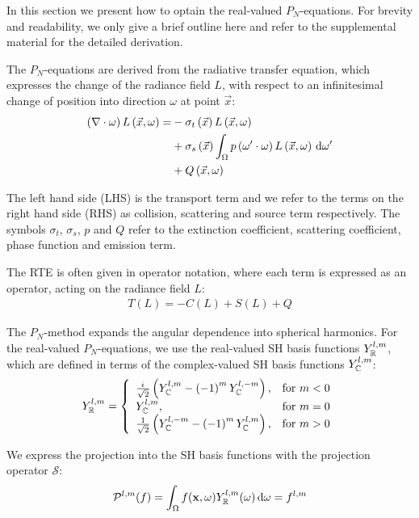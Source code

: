 In this section we present how to optain the real-valued $P_N$-equations. For brevity and readability, we only give a brief outline here and refer to the supplemental material for the detailed derivation.

The $P_N$-equations are derived from the radiative transfer equation, which expresses the change of the radiance field $L$, with respect to an infinitesimal change of position into direction $\omega$ at point $\vec{x}$:
\begin{align}
\left(\nabla\cdot\omega\right)L\left(\vec{x}, \omega \right)
=&
-\sigma_t\left(\vec{x}\right) L\left(\vec{x}, \omega \right)\nonumber\\
&
+\sigma_s\left(\vec{x}\right) \int_{\Omega}
{
p\left(\omega'\cdot\omega\right)L\left(\vec{x}, \omega \right)\,\mathrm{d}\omega'
}\nonumber\\
&
+Q\left(\vec{x}, \omega\right)\nonumber
\end{align}

The left hand side (LHS) is the transport term and we refer to the terms on the right hand side (RHS) as collision, scattering and source term respectively. The symbols $\sigma_t$, $\sigma_s$, $p$ and $Q$ refer to the extinction coefficient, scattering coefficient, phase function and emission term.

The RTE is often given in operator notation, where each term is expressed as an operator, acting on the radiance field $L$:
\begin{align}
T\left(L\right) = -C\left(L\right) + S\left(L\right) + Q
\end{align}

The $P_N$-method expands the angular dependence into spherical harmonics. For the real-valued $P_N$-equations, we use the real-valued SH basis functions $Y_{\mathbb{R}}^{l,m}$, which are defined in terms of the complex-valued SH basis functions $Y_{\mathbb{C}}^{l,m}$:
\begin{align*}
Y_{\mathbb{R}}^{l,m}=
\left\{
\begin{array}{lr}
\frac{{i\mkern1mu}}{\sqrt{2}}\left(Y_{\mathbb{C}}^{l,m}-\left(-1\right)^mY_{\mathbb{C}}^{l,-m}\right), & \text{for } m < 0\\
Y_{\mathbb{C}}^{l,m}, & \text{for } m = 0\\
\frac{1}{\sqrt{2}}\left(Y_{\mathbb{C}}^{l,-m}-\left(-1\right)^mY_{\mathbb{C}}^{l,m}\right), & \text{for } m > 0
\end{array}
\right.
\end{align*}

We express the projection into the SH basis functions with the projection operator $\mathcal{S}$:
\begin{align}
\mathcal{P}^{l, m}(f) = \int_{\Omega}f(\mathbf{x}, \omega) Y_{\mathbb{R}}^{l,m}(\omega)\,\mathrm{d}\omega = f^{l,m}
\nonumber
\end{align}

